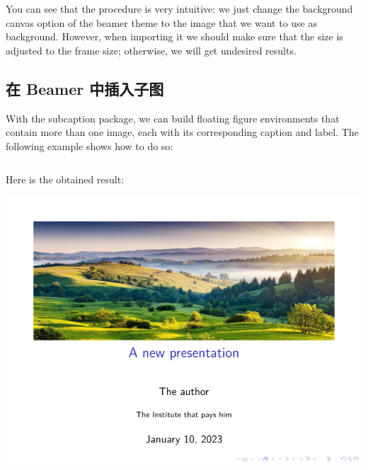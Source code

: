 \begin{column}{0.5\textwidth}
You can see that the procedure is very intuitive: we just change the background canvas option of the beamer theme to the image that we want to use as background. However, when importing it we should make sure that the size is adjusted to the frame size; otherwise, we will get undesired results.

\subsection{在 Beamer 中插入子图}

With the subcaption package, we can build floating figure environments that contain more than one image, each with its corresponding caption and label. The following example shows how to do so:

\inputminted[linenos=true]{latex}{examples/beamer/figure-titlepage2.tex}

Here is the obtained result:

\includegraphics{examples/beamer/figure-titlepage2.pdf}


\end{column}
